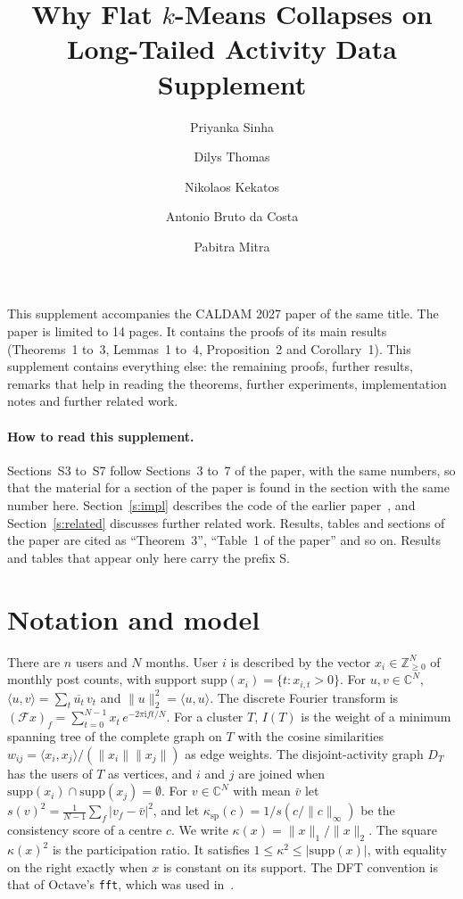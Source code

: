 \documentclass[11pt]{article}
\title{Why Flat $k$-Means Collapses on Long-Tailed Activity Data\\[4pt]\large Supplement}
\author{Priyanka Sinha \and Dilys Thomas \and Nikolaos Kekatos \and Antonio Bruto da Costa \and Pabitra Mitra}
\date{}
\newcommand{\C}{\mathbb{C}}
\newcommand{\F}{\mathcal{F}}
\newcommand{\supp}{\mathrm{supp}}
\newcommand{\ip}[2]{\langle #1, #2 \rangle}
\newcommand{\norm}[1]{\lVert #1 \rVert}
\theoremstyle{remark}\newtheorem{remark}{Remark}\renewcommand{\theremark}{S\arabic{remark}}
\begin{document}
\maketitle

\noindent This supplement accompanies the CALDAM 2027 paper of the same title. The paper is limited to 14 pages. It contains the proofs of its main results (Theorems~1 to~3, Lemmas~1 to~4, Proposition~2 and Corollary~1). This supplement contains everything else: the remaining proofs, further results, remarks that help in reading the theorems, further experiments, implementation notes and further related work.

\paragraph{How to read this supplement.} Sections~S3 to~S7 follow Sections~3 to~7 of the paper, with the same numbers, so that the material for a section of the paper is found in the section with the same number here. Section~\ref{s:impl} describes the code of the earlier paper~\cite{sinha2020hierarchical}, and Section~\ref{s:related} discusses further related work. Results, tables and sections of the paper are cited as ``Theorem~3'', ``Table~1 of the paper'' and so on. Results and tables that appear only here carry the prefix S.

\tableofcontents

\section*{Notation and model}
There are $n$ users and $N$ months. User $i$ is described by the vector $x_i\in\mathbb{Z}_{\ge0}^N$ of monthly post counts, with support $\supp(x_i)=\{t:x_{i,t}>0\}$. For $u,v\in\C^N$, $\ip{u}{v}=\sum_t\overline{u_t}\,v_t$ and $\norm{u}_2^2=\ip{u}{u}$. The discrete Fourier transform is $(\F x)_f=\sum_{t=0}^{N-1}x_t\,e^{-2\pi\mathrm{i}ft/N}$. For a cluster $T$, $I(T)$ is the weight of a minimum spanning tree of the complete graph on $T$ with the cosine similarities $w_{ij}=\ip{x_i}{x_j}/(\norm{x_i}\norm{x_j})$ as edge weights. The disjoint-activity graph $D_T$ has the users of $T$ as vertices, and $i$ and $j$ are joined when $\supp(x_i)\cap\supp(x_j)=\emptyset$. For $v\in\C^N$ with mean $\bar v$ let $s(v)^2=\frac1{N-1}\sum_f|v_f-\bar v|^2$, and let $\kappa_{\mathrm{sp}}(c)=1/s(c/\norm{c}_\infty)$ be the consistency score of a centre $c$. We write $\kappa(x)=\norm{x}_1/\norm{x}_2$. The square $\kappa(x)^2$ is the participation ratio. It satisfies $1\le\kappa^2\le|\supp(x)|$, with equality on the right exactly when $x$ is constant on its support. The DFT convention is that of Octave's \texttt{fft}, which was used in~\cite{sinha2020hierarchical}.
\end{document}
